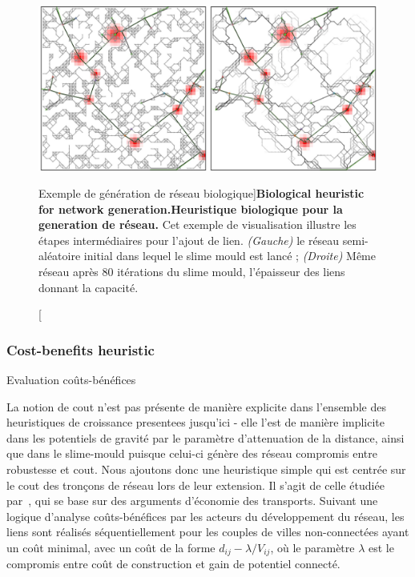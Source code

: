 \begin{figure}
\includegraphics[width=\linewidth]{Figures/Final/7-1-1-fig-networkgrowth-bioexample.jpg}
\caption[Biological Network Example][Exemple de génération de réseau biologique]{\textbf{Biological heuristic for network generation.}\label{fig:networkgrowth:bioexample}}{\textbf{Heuristique biologique pour la generation de réseau.} Cet exemple de visualisation illustre les étapes intermédiaires pour l'ajout de lien. \textit{(Gauche)} le réseau semi-aléatoire initial dans lequel le slime mould est lancé ; \textit{(Droite)} Même réseau après 80 itérations du slime mould, l'épaisseur des liens donnant la capacité.\label{fig:networkgrowth:bioexample}}
\end{figure}


\subsubsection{Cost-benefits heuristic}{Evaluation coûts-bénéfices}

La notion de cout n'est pas présente de manière explicite dans l'ensemble des heuristiques de croissance presentees jusqu'ici - elle l'est de manière implicite dans les potentiels de gravité par le paramètre d'attenuation de la distance, ainsi que dans le slime-mould puisque celui-ci génère des réseau compromis entre robustesse et cout. Nous ajoutons donc une heuristique simple qui est centrée sur le cout des tronçons de réseau lors de leur extension. Il s'agit de celle étudiée par~\cite{louf2013emergence}, qui se base sur des arguments d'économie des transports. Suivant une logique d'analyse coûts-bénéfices par les acteurs du développement du réseau, les liens sont réalisés séquentiellement pour les couples de villes non-connectées ayant un coût minimal, avec un coût de la forme $d_{ij} - \lambda / V_{ij}$, où le paramètre $\lambda$ est le compromis entre coût de construction et gain de potentiel connecté.


